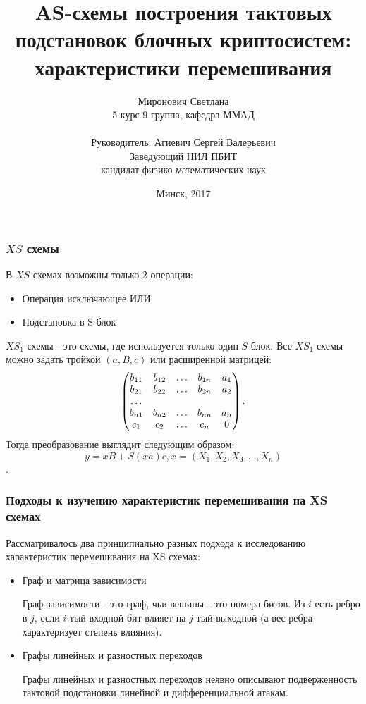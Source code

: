 \documentclass{beamer}
\title[XS-схемы] %
{AS-схемы построения тактовых подстановок блочных криптосистем: характеристики перемешивания}
\author[Миронович С.] %
{Миронович Светлана\\ 5 курс 9 группа, кафедра ММАД\\~ \\Руководитель: Агиевич Сергей Валерьевич \\ Заведующий НИЛ ПБИТ\\ кандидат физико-математических наук}
\institute[БГУ] %
{
  Белорусский государственный университет\\
  Факультет прикладной математики и информатики
}
\date[2017] %
{Минск, 2017}
\begin{document}
\frame{\titlepage}

  \begin{frame}
    \frametitle{$XS$ схемы}
В $XS$-схемах возможны только 2 операции:
\begin{itemize}
\item Операция исключающее ИЛИ
\item Подстановка в S-блок
\end{itemize}
$XS_1$-схемы - это схемы, где используется только один $S$-блок.
Все $XS_1$-схемы можно задать тройкой $(a, B, c)$ или расширенной матрицей:
$$
\begin{pmatrix}
b_{11} & b_{12} & \ldots & b_{1n} & a_1\\
b_{21} & b_{22} & \ldots & b_{2n} & a_2\\
\dotfill\\
b_{n1} & b_{n2} & \ldots & b_{nn} & a_n\\
c_1    & c_2    & \ldots & c_n    & 0\\
\end{pmatrix}.
$$
Тогда преобразование выглядит следующим образом:
$$y = xB + S(xa)c, x = (X_1, X_2, X_3, ..., X_n)$$.
  \end{frame}

 \begin{frame}
    \frametitle{Подходы к изучению характеристик перемешивания на XS схемах}

Рассматривалось два принципиально разных подхода к исследованию характеристик перемешивания на XS схемах:
\begin{itemize}
\item Граф и матрица зависимости

Граф зависимости - это граф, чьи вешины - это номера битов. Из $i$ есть ребро в $j$, если $i$-тый входной бит влияет на $j$-тый выходной (а вес ребра характеризует степень влияния).
\item Графы линейных и разностных переходов

Графы линейных и разностных переходов неявно описывают подверженность тактовой подстановки линейной и дифференциальной атакам.
\end{itemize}
  \end{frame}
\end{document}
